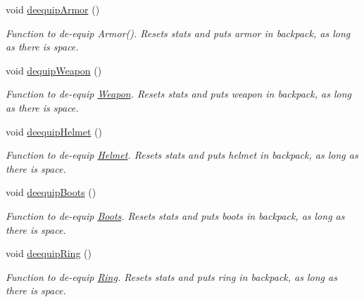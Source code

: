 \begin{DoxyCompactItemize}
\item 
\hypertarget{class_fighter_ac7a95f5d4b59bca227f847924625ffc2}{}\label{class_fighter_ac7a95f5d4b59bca227f847924625ffc2} 
void \hyperlink{class_fighter_ac7a95f5d4b59bca227f847924625ffc2}{deequip\+Armor} ()
\begin{DoxyCompactList}\small\item\em Function to de-\/equip Armor(). Resets stats and puts armor in backpack, as long as there is space. \end{DoxyCompactList}\item 
\hypertarget{class_fighter_a277fd0526a0318923f2775356f30972f}{}\label{class_fighter_a277fd0526a0318923f2775356f30972f} 
void \hyperlink{class_fighter_a277fd0526a0318923f2775356f30972f}{dequip\+Weapon} ()
\begin{DoxyCompactList}\small\item\em Function to de-\/equip \hyperlink{class_weapon}{Weapon}. Resets stats and puts weapon in backpack, as long as there is space. \end{DoxyCompactList}\item 
\hypertarget{class_fighter_a9e6f83324d66e6467d8af19e91c13781}{}\label{class_fighter_a9e6f83324d66e6467d8af19e91c13781} 
void \hyperlink{class_fighter_a9e6f83324d66e6467d8af19e91c13781}{deequip\+Helmet} ()
\begin{DoxyCompactList}\small\item\em Function to de-\/equip \hyperlink{class_helmet}{Helmet}. Resets stats and puts helmet in backpack, as long as there is space. \end{DoxyCompactList}\item 
\hypertarget{class_fighter_add80df04f0659d37c0e30e91314e3d5e}{}\label{class_fighter_add80df04f0659d37c0e30e91314e3d5e} 
void \hyperlink{class_fighter_add80df04f0659d37c0e30e91314e3d5e}{deequip\+Boots} ()
\begin{DoxyCompactList}\small\item\em Function to de-\/equip \hyperlink{class_boots}{Boots}. Resets stats and puts boots in backpack, as long as there is space. \end{DoxyCompactList}\item 
\hypertarget{class_fighter_a1b64aab99d09a1d9a31b8674b4d0176c}{}\label{class_fighter_a1b64aab99d09a1d9a31b8674b4d0176c} 
void \hyperlink{class_fighter_a1b64aab99d09a1d9a31b8674b4d0176c}{deequip\+Ring} ()
\begin{DoxyCompactList}\small\item\em Function to de-\/equip \hyperlink{class_ring}{Ring}. Resets stats and puts ring in backpack, as long as there is space. \end{DoxyCompactList}\item 

\end{DoxyCompactItemize}
